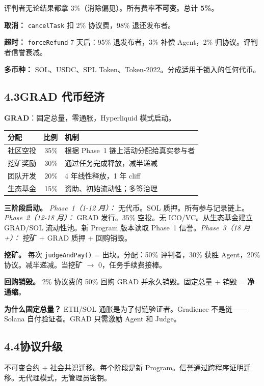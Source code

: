 \documentclass[11pt,a4paper]{article}
\begin{document}
评判者无论结果都拿 3\%（消除偏见）。所有费率\textbf{不可变}。总计 \textbf{5\%}。

\textbf{取消：} \texttt{cancelTask} 扣 2\% 协议费，98\% 退还发布者。

\textbf{超时：} \texttt{forceRefund} 7 天后：95\% 退发布者，3\% 补偿 Agent，2\% 归协议。评判者信誉衰减。

\textbf{多币种：} SOL、USDC、SPL Token、Token-2022。分成适用于锁入的任何代币。

\subsection{4.3\quad GRAD 代币经济}

\textbf{GRAD}：固定总量，零通胀，Hyperliquid 模式启动。

\begin{table}[H]\centering\small
\begin{tabular}{@{}lrl@{}}
\toprule
\textbf{分配} & \textbf{比例} & \textbf{机制} \\
\midrule
社区空投 & 35\% & 根据 Phase~1 链上活动分配给真实参与者 \\
挖矿奖励 & 30\% & 通过任务完成释放，减半递减 \\
团队开发 & 20\% & 4 年线性释放，1 年 cliff \\
生态基金 & 15\% & 资助、初始流动性；多签治理 \\
\bottomrule
\end{tabular}
\end{table}

\textbf{三阶段启动。} \emph{Phase~1（1-12 月）：} 无代币。SOL 质押。所有参与记录链上。\emph{Phase~2（12-18 月）：} GRAD 发行。35\% 空投。无 ICO/VC。从生态基金建立 GRAD/SOL 流动性池。新 Program 版本读取 Phase~1 信誉。\emph{Phase~3（18 月+）：} 挖矿 + GRAD 质押 + 回购销毁。

\textbf{挖矿。} 每次 \texttt{judgeAndPay()} = 出块。分配：50\% 评判者，30\% 获胜 Agent，20\% 协议。减半递减。当挖矿 $\to$ 0，任务手续费接棒。

\textbf{回购销毁。} 2\% 协议费的 50\% 回购 GRAD 并永久销毁。固定总量 + 销毁 = \textbf{净通缩}。

\textbf{为什么固定总量？} ETH/SOL 通胀是为了付链验证者。Gradience 不是链——Solana 自付验证者。GRAD 只需激励 Agent 和 Judge。

\subsection{4.4\quad 协议升级}
不可变合约 + 社会共识迁移。每个阶段是新 Program。信誉通过跨程序证明迁移。无代理模式，无管理员密钥。
\end{document}
